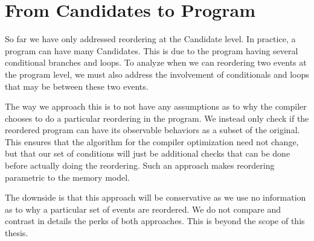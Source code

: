 \section{From Candidates to Program}

    So far we have only addressed reordering at the Candidate level. In practice, a program can have many Candidates. This is due to the program having several conditional branches and loops. To analyze when we can reordering two events at the program level, we must also address the involvement of conditionals and loops that may be between these two events.
    
    The way we approach this is to not have any assumptions as to why the compiler chooses to do a particular reordering in the program. 
    We instead only check if the reordered program can have its observable behaviors as a subset of the original. This ensures that the algorithm for the compiler optimization need not change, but that our set of conditions will just be additional checks that can be done before actually doing the reordering. Such an approach makes reordering parametric to the memory model. 

    The downside is that this approach will be conservative as we use no information as to why a particular set of events are reordered. We do not compare and contrast in details the perks of both approaches. This is beyond the scope of this thesis.
    
    

    

    